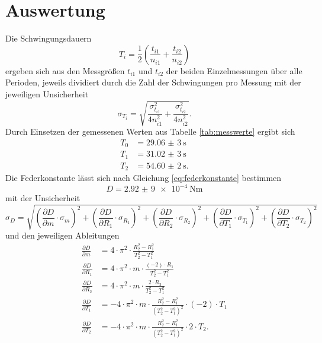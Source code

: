 \section{Auswertung}

Die Schwingungsdauern 
\begin{equation}
    T_i = \frac{1}{2}\left(\frac{t_{i1}}{n_{i1}} + \frac{t_{i2}}{n_{i2}}\right)
\end{equation}
ergeben sich aus den Messgrößen $t_{i1}$ und $t_{i2}$ der beiden Einzelmessungen über alle Perioden, jeweils dividiert durch die Zahl der Schwingungen pro Messung mit der jeweiligen Unsicherheit
\begin{equation}
    \sigma_{T_i} = \sqrt{\frac{\sigma_{t_{i1}}^2}{4 n_{i1}^2} + \frac{\sigma_{t_{i2}}^2}{4 n_{i2}^2}} .
\end{equation}
Durch Einsetzen der gemessenen Werten aus Tabelle \ref{tab:messwerte} ergibt sich
\begin{align*}
    T_0 &= \qty{29,06(3)}{\second} \\
    T_1 &= \qty{31,02(3)}{\second} \\
    T_2 &= \qty{54,60(2)}{\second} .
\end{align*}
Die Federkonstante lässt sich nach Gleichung \eqref{eq:federkonstante} bestimmen
\begin{equation*}
    D = \qty{2,92(9)e-4}{\newton\meter}
\end{equation*}
mit der Unsicherheit
\begin{equation*}
    \sigma_D = \sqrt{\left(\frac{\partial D}{\partial m}\cdot \sigma_{m}\right)^2+\left(\frac{\partial D}{\partial R_1}\cdot \sigma_{R_1}\right)^2+\left(\frac{\partial D}{\partial R_2}\cdot \sigma_{R_2}\right)^2+\left(\frac{\partial D}{\partial T_1}\cdot \sigma_{T_1}\right)^2+\left(\frac{\partial D}{\partial T_2}\cdot \sigma_{T_2}\right)^2}
\end{equation*}
und den jeweiligen Ableitungen
\begin{align*}
    \frac{\partial D}{\partial m} &= 4\cdot \pi^2\cdot \frac{R_2^2 - R_1^2}{T_2^2 - T_1^2} \\
    \frac{\partial D}{\partial R_1} &= 4\cdot \pi^2\cdot m\cdot \frac{(-2)\cdot R_1}{T_2^2 - T_1^2} \\
    \frac{\partial D}{\partial R_2} &= 4\cdot \pi^2\cdot m\cdot \frac{2\cdot R_2}{T_2^2 - 
    T_1^2} \\
    \frac{\partial D}{\partial T_1} &= -4\cdot \pi^2\cdot m\cdot \frac{R_2^2 - R_1^2}{(T_2^2-T_1^2)^2}\cdot (-2)\cdot T_1 \\
    \frac{\partial D}{\partial T_2} &= -4\cdot \pi^2\cdot m\cdot \frac{R_2^2 - R_1^2}{(T_2^2 - T_1^2)^2}\cdot 2\cdot T_2 .
\end{align*}
